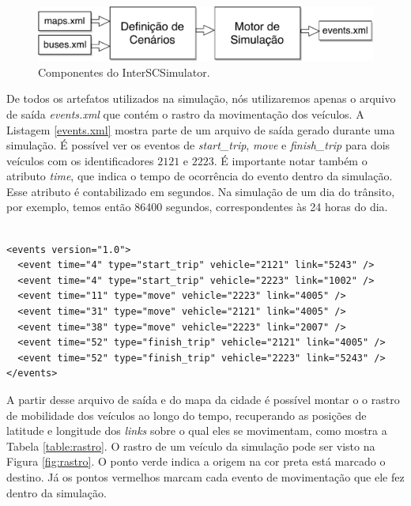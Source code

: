 {\begin{figure}[!htb]
  \centering
  \includegraphics[width=\textwidth]{../figuras/arquitetura-simulador.pdf}
  \caption[Componentes do InterSCSimulator]{Componentes do InterSCSimulator. \label{fig:interscsimulator}}
\end{figure}

  De todos os artefatos utilizados na simulação, nós utilizaremos apenas o
arquivo de saída \emph{events.xml} que contém o rastro da movimentação dos
veículos. A Listagem \ref{events.xml} mostra parte de um arquivo de saída
gerado durante uma simulação. É possível ver os eventos de \emph{start\_trip},
\emph{move} e \emph{finish\_trip} para dois veículos com os identificadores
$2121$ e $2223$.  É importante notar também o atributo \emph{time}, que indica o
tempo de ocorrência do evento dentro da simulação. Esse atributo  é contabilizado
em segundos. Na simulação de um dia do trânsito, por exemplo, temos então
86400 segundos, correspondentes às 24 horas do dia.

\begin{lstlisting}[style=myxml, caption={Exemplo de arquivo de saída events.xml com os eventos da simulação.}, label=events.xml]

<events version="1.0">
  <event time="4" type="start_trip" vehicle="2121" link="5243" />
  <event time="4" type="start_trip" vehicle="2223" link="1002" />
  <event time="11" type="move" vehicle="2223" link="4005" />
  <event time="31" type="move" vehicle="2121" link="4005" />
  <event time="38" type="move" vehicle="2223" link="2007" />
  <event time="52" type="finish_trip" vehicle="2121" link="4005" />
  <event time="52" type="finish_trip" vehicle="2223" link="5243" />
</events>
\end{lstlisting}

  A partir desse arquivo de saída e do mapa da cidade é possível montar o
o rastro de mobilidade dos veículos ao longo do tempo,
recuperando as posições de latitude e longitude dos \emph{links} sobre o qual
eles se movimentam, como mostra a Tabela \ref{table:rastro}. O rastro de um veículo
da simulação pode ser visto na Figura \ref{fig:rastro}. O ponto verde indica a origem na cor
preta está marcado o destino. Já os pontos vermelhos marcam cada evento
de movimentação que ele fez dentro da simulação.

}
